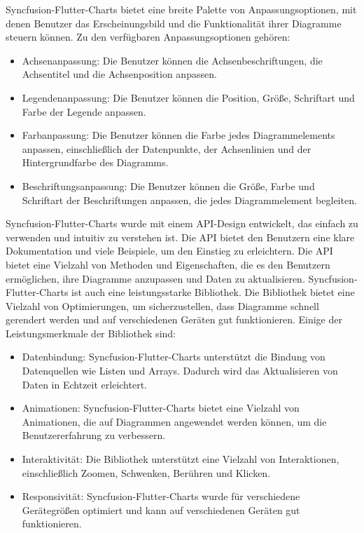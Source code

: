 Syncfusion-Flutter-Charts bietet eine breite Palette von Anpassungsoptionen, mit denen Benutzer das Erscheinungsbild und die Funktionalität ihrer Diagramme steuern können. 
Zu den verfügbaren Anpassungsoptionen gehören:
\begin{itemize}
    \item Achsenanpassung: Die Benutzer können die Achsenbeschriftungen, die Achsentitel und die Achsenposition anpassen.
    \item Legendenanpassung: Die Benutzer können die Position, Größe, Schriftart und Farbe der Legende anpassen.
    \item Farbanpassung: Die Benutzer können die Farbe jedes Diagrammelements anpassen, einschließlich der Datenpunkte, der Achsenlinien und der Hintergrundfarbe des Diagramms.
    \item Beschriftungsanpassung: Die Benutzer können die Größe, Farbe und Schriftart der Beschriftungen anpassen, die jedes Diagrammelement begleiten.
\end{itemize}
Syncfusion-Flutter-Charts wurde mit einem API-Design entwickelt, 
das einfach zu verwenden und intuitiv zu verstehen ist. 
Die API bietet den Benutzern eine klare Dokumentation und viele Beispiele, um den Einstieg zu erleichtern. 
Die API bietet eine Vielzahl von Methoden und Eigenschaften, die es den Benutzern ermöglichen, ihre Diagramme 
anzupassen und Daten zu aktualisieren.
\newline
Syncfusion-Flutter-Charts ist auch eine leistungsstarke Bibliothek. 
Die Bibliothek bietet eine Vielzahl von Optimierungen, um sicherzustellen, dass Diagramme schnell gerendert werden und auf verschiedenen Geräten gut funktionieren. 
Einige der Leistungsmerkmale der Bibliothek sind:
\begin{itemize}
    \item Datenbindung: Syncfusion-Flutter-Charts unterstützt die Bindung von Datenquellen wie Listen und Arrays. Dadurch wird das Aktualisieren von Daten in Echtzeit erleichtert.
    \item Animationen: Syncfusion-Flutter-Charts bietet eine Vielzahl von Animationen, die auf Diagrammen angewendet werden können, um die Benutzererfahrung zu verbessern.
    \item Interaktivität: Die Bibliothek unterstützt eine Vielzahl von Interaktionen, einschließlich Zoomen, Schwenken, Berühren und Klicken.
    \item Responsivität: Syncfusion-Flutter-Charts wurde für verschiedene Gerätegrößen optimiert und kann auf verschiedenen Geräten gut funktionieren.
\end{itemize}

